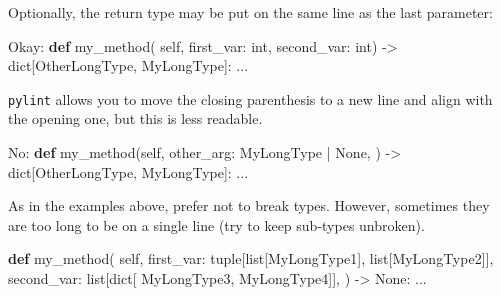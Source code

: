 \documentclass[
]{article}
\newenvironment{Shaded}{}{}
\newcommand{\BuiltInTok}[1]{\textcolor[rgb]{0.00,0.50,0.00}{#1}}
\newcommand{\KeywordTok}[1]{\textcolor[rgb]{0.00,0.44,0.13}{\textbf{#1}}}
\newcommand{\NormalTok}[1]{#1}
\newcommand{\OperatorTok}[1]{\textcolor[rgb]{0.40,0.40,0.40}{#1}}
\newcommand{\VariableTok}[1]{\textcolor[rgb]{0.10,0.09,0.49}{#1}}
\begin{document}
Optionally, the return type may be put on the same line as the last
parameter:

\begin{samepage}
\begin{Shaded}
\begin{Highlighting}[]
\NormalTok{Okay:}
\KeywordTok{def}\NormalTok{ my\_method(}
    \VariableTok{self}\NormalTok{,}
\NormalTok{    first\_var: }\BuiltInTok{int}\NormalTok{,}
\NormalTok{    second\_var: }\BuiltInTok{int}\NormalTok{) }\OperatorTok{{-}\textgreater{}} \BuiltInTok{dict}\NormalTok{[OtherLongType, MyLongType]:}
\NormalTok{  ...}
\end{Highlighting}
\end{Shaded}
\end{samepage}

\texttt{pylint} allows you to move the closing parenthesis to a new line
and align with the opening one, but this is less readable.

\begin{samepage}
\begin{Shaded}
\begin{Highlighting}[]
\NormalTok{No:}
\KeywordTok{def}\NormalTok{ my\_method(}\VariableTok{self}\NormalTok{,}
\NormalTok{              other\_arg: MyLongType }\OperatorTok{|} \VariableTok{None}\NormalTok{,}
\NormalTok{             ) }\OperatorTok{{-}\textgreater{}} \BuiltInTok{dict}\NormalTok{[OtherLongType, MyLongType]:}
\NormalTok{  ...}
\end{Highlighting}
\end{Shaded}
\end{samepage}

As in the examples above, prefer not to break types. However, sometimes
they are too long to be on a single line (try to keep sub-types
unbroken).

\begin{samepage}
\begin{Shaded}
\begin{Highlighting}[]
\KeywordTok{def}\NormalTok{ my\_method(}
    \VariableTok{self}\NormalTok{,}
\NormalTok{    first\_var: }\BuiltInTok{tuple}\NormalTok{[}\BuiltInTok{list}\NormalTok{[MyLongType1],}
                     \BuiltInTok{list}\NormalTok{[MyLongType2]],}
\NormalTok{    second\_var: }\BuiltInTok{list}\NormalTok{[}\BuiltInTok{dict}\NormalTok{[}
\NormalTok{        MyLongType3, MyLongType4]],}
\NormalTok{) }\OperatorTok{{-}\textgreater{}} \VariableTok{None}\NormalTok{:}
\NormalTok{  ...}
\end{Highlighting}
\end{Shaded}
\end{samepage}
\end{document}
